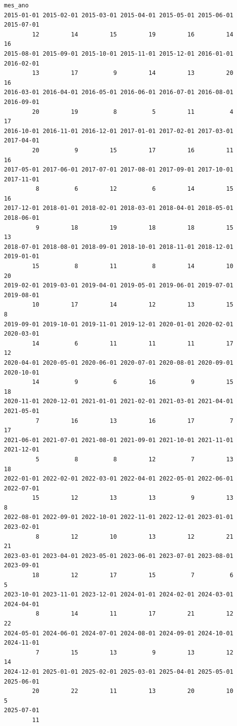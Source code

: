 \documentclass[
  letterpaper,
  DIV=11,
  numbers=noendperiod]{scrreprt}
\begin{document}
\begin{verbatim}
mes_ano
2015-01-01 2015-02-01 2015-03-01 2015-04-01 2015-05-01 2015-06-01 2015-07-01 
        12         14         15         19         16         14         16 
2015-08-01 2015-09-01 2015-10-01 2015-11-01 2015-12-01 2016-01-01 2016-02-01 
        13         17          9         14         13         20         16 
2016-03-01 2016-04-01 2016-05-01 2016-06-01 2016-07-01 2016-08-01 2016-09-01 
        20         19          8          5         11          4         17 
2016-10-01 2016-11-01 2016-12-01 2017-01-01 2017-02-01 2017-03-01 2017-04-01 
        20          9         15         17         16         11         16 
2017-05-01 2017-06-01 2017-07-01 2017-08-01 2017-09-01 2017-10-01 2017-11-01 
         8          6         12          6         14         15         16 
2017-12-01 2018-01-01 2018-02-01 2018-03-01 2018-04-01 2018-05-01 2018-06-01 
         9         18         19         18         18         15         13 
2018-07-01 2018-08-01 2018-09-01 2018-10-01 2018-11-01 2018-12-01 2019-01-01 
        15          8         11          8         14         10         20 
2019-02-01 2019-03-01 2019-04-01 2019-05-01 2019-06-01 2019-07-01 2019-08-01 
        10         17         14         12         13         15          8 
2019-09-01 2019-10-01 2019-11-01 2019-12-01 2020-01-01 2020-02-01 2020-03-01 
        14          6         11         11         11         17         12 
2020-04-01 2020-05-01 2020-06-01 2020-07-01 2020-08-01 2020-09-01 2020-10-01 
        14          9          6         16          9         15         18 
2020-11-01 2020-12-01 2021-01-01 2021-02-01 2021-03-01 2021-04-01 2021-05-01 
         7         16         13         16         17          7         17 
2021-06-01 2021-07-01 2021-08-01 2021-09-01 2021-10-01 2021-11-01 2021-12-01 
         5          8          8         12          7         13         18 
2022-01-01 2022-02-01 2022-03-01 2022-04-01 2022-05-01 2022-06-01 2022-07-01 
        15         12         13         13          9         13          8 
2022-08-01 2022-09-01 2022-10-01 2022-11-01 2022-12-01 2023-01-01 2023-02-01 
         8         12         10         13         12         21         21 
2023-03-01 2023-04-01 2023-05-01 2023-06-01 2023-07-01 2023-08-01 2023-09-01 
        18         12         17         15          7          6          5 
2023-10-01 2023-11-01 2023-12-01 2024-01-01 2024-02-01 2024-03-01 2024-04-01 
         8         14         11         17         21         12         22 
2024-05-01 2024-06-01 2024-07-01 2024-08-01 2024-09-01 2024-10-01 2024-11-01 
         7         15         13          9         13         12         14 
2024-12-01 2025-01-01 2025-02-01 2025-03-01 2025-04-01 2025-05-01 2025-06-01 
        20         22         11         13         20         10          5 
2025-07-01 
        11 
\end{verbatim}
\end{document}
